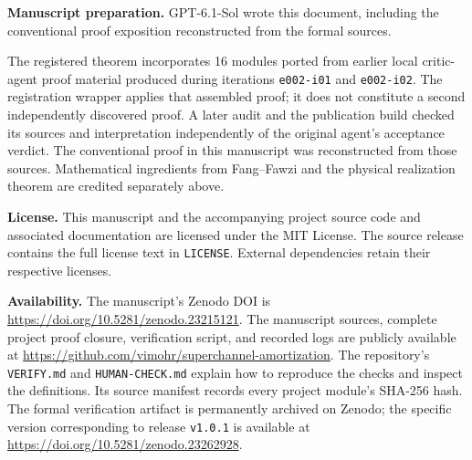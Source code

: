 \documentclass[11pt]{article}
\newcommand{\code}[1]{{\small\nolinkurl{#1}}}
\theoremstyle{remark}
\begin{document}
\textbf{Manuscript preparation.} GPT-6.1-Sol wrote this document, including the
conventional proof exposition reconstructed from the formal sources.

The registered theorem incorporates 16 modules ported from earlier local
critic-agent proof material produced during iterations
\code{e002-i01} and \code{e002-i02}. The registration wrapper applies that
assembled proof; it does not constitute a second independently discovered
proof. A later audit and the publication build checked its sources and
interpretation independently of the original agent's acceptance verdict.
The conventional proof in this manuscript was reconstructed from those
sources. Mathematical ingredients from Fang--Fawzi and the physical
realization theorem are credited separately above.

\textbf{License.} This manuscript and the accompanying project source code and
associated documentation are licensed under the MIT License. The source release
contains the full license text in \code{LICENSE}. External dependencies retain
their respective licenses.

\textbf{Availability.}
The manuscript's Zenodo DOI is
\url{https://doi.org/10.5281/zenodo.23215121}.
The manuscript sources, complete project proof closure,
verification script, and recorded logs are publicly available at
\url{https://github.com/vimohr/superchannel-amortization}.
The repository's \code{VERIFY.md} and \code{HUMAN-CHECK.md} explain how to
reproduce the checks and inspect the definitions. Its source manifest records
every project module's SHA-256 hash. The formal verification artifact is
permanently archived on Zenodo; the specific version corresponding to release
\code{v1.0.1} is available at
\url{https://doi.org/10.5281/zenodo.23262928}.



\end{document}
